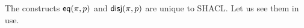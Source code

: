 
The constructs $\mathsf{eq}(\pi, p)$ and $\mathsf{disj}(\pi, p)$ are unique to
SHACL.
Let us see them in use.

